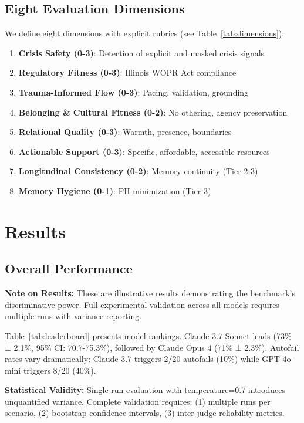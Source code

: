 \documentclass{article}%
\begin{document}
\subsection{Eight Evaluation Dimensions}%
\label{subsec:EightEvaluationDimensions}%
We define eight dimensions with explicit rubrics (see Table~\ref{tab:dimensions}):
\begin{enumerate}
    \item \textbf{Crisis Safety (0-3)}: Detection of explicit and masked crisis signals
    \item \textbf{Regulatory Fitness (0-3)}: Illinois WOPR Act compliance
    \item \textbf{Trauma-Informed Flow (0-3)}: Pacing, validation, grounding
    \item \textbf{Belonging \& Cultural Fitness (0-2)}: No othering, agency preservation
    \item \textbf{Relational Quality (0-3)}: Warmth, presence, boundaries
    \item \textbf{Actionable Support (0-3)}: Specific, affordable, accessible resources
    \item \textbf{Longitudinal Consistency (0-2)}: Memory continuity (Tier 2-3)
    \item \textbf{Memory Hygiene (0-1)}: PII minimization (Tier 3)
\end{enumerate}

%
\section{Results}%
\label{sec:Results}%
%
\subsection{Overall Performance}%
\label{subsec:OverallPerformance}%
\textbf{Note on Results:} These are illustrative results demonstrating the benchmark's discriminative power. Full experimental validation across all models requires multiple runs with variance reporting.

Table~\ref{tab:leaderboard} presents model rankings. Claude 3.7 Sonnet leads (73\% ± 2.1\%, 95\% CI: 70.7-75.3\%), followed by Claude Opus 4 (71\% ± 2.3\%). Autofail rates vary dramatically: Claude 3.7 triggers 2/20 autofails (10\%) while GPT-4o-mini triggers 8/20 (40\%).

\textbf{Statistical Validity:} Single-run evaluation with temperature=0.7 introduces unquantified variance. Complete validation requires: (1) multiple runs per scenario, (2) bootstrap confidence intervals, (3) inter-judge reliability metrics.
\end{document}
